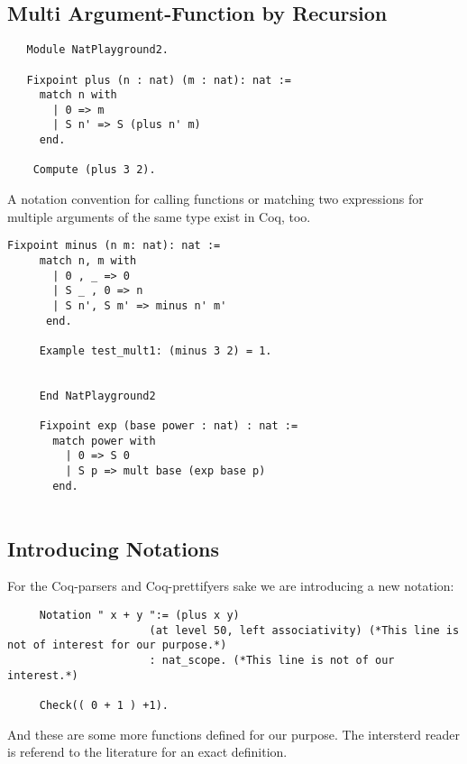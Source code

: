    \subsection{Multi Argument-Function by Recursion}
   
   \begin{lstlisting}
   Module NatPlayground2.
   
   Fixpoint plus (n : nat) (m : nat): nat :=
     match n with
       | 0 => m
       | S n' => S (plus n' m)
     end.
     
    Compute (plus 3 2). 
   \end{lstlisting}
   
    A notation convention for calling functions or matching two expressions for multiple arguments of the same type exist in Coq, too.
   
   \begin{lstlisting}[label = lst:minus_nat, caption={ \lstinline!minus! and \lstinline!exp!}]
    Fixpoint minus (n m: nat): nat :=
     match n, m with
       | 0 , _ => 0
       | S _ , 0 => n
       | S n', S m' => minus n' m'
      end.
      
     Example test_mult1: (minus 3 2) = 1.
     
      
     End NatPlayground2
     
     Fixpoint exp (base power : nat) : nat :=
       match power with
         | 0 => S 0
         | S p => mult base (exp base p)
       end.
         
   \end{lstlisting}
        
   \subsection{Introducing Notations}


    For the Coq-parsers and Coq-prettifyers sake we are introducing a new notation:
    
    \begin{lstlisting}
     Notation " x + y ":= (plus x y)
                      (at level 50, left associativity) (*This line is not of interest for our purpose.*)
                      : nat_scope. (*This line is not of our interest.*)
                      
     Check(( 0 + 1 ) +1).
    \end{lstlisting} 
   
   And these are some more functions defined for our purpose. 
   The intersterd reader is referend to the literature for an exact definition.  
   
